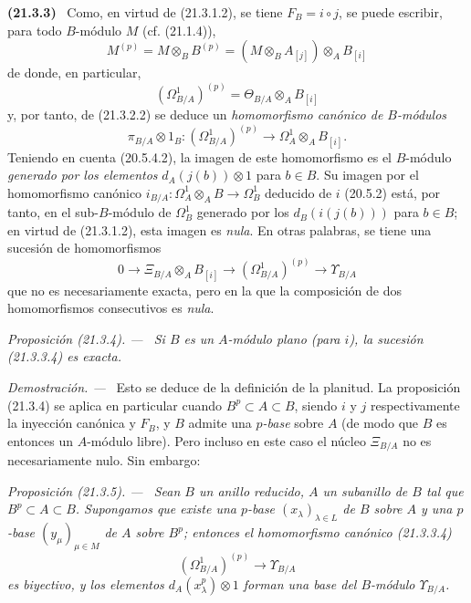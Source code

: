 \documentclass[10pt,oneside]{book}
\makeatletter
\newcommand{\setmanualcurrentlabel}[1]{\def\@currentlabel{#1}}
\newenvironment{env}[1][]{\setmanualcurrentlabel{#1}\par\medskip\noindent\textbf{(#1)}\ }{\par}
\newenvironment{proposition}[1][]{%
  \setmanualcurrentlabel{#1}\par\medskip\noindent\itshape Proposición (#1). ---\ }{\par}
\newenvironment{proof}{%
  \par\medskip\noindent\textit{Demostración. ---\ }}{\par}
\makeatother
\begin{document}
\begin{env}[21.3.3]
\label{0.21.3.3-es}
Como, en virtud de (21.3.1.2), se tiene $F_B=i\circ j$, se puede escribir,
para todo $B$-módulo $M$ (cf. (21.1.4)),
\begin{equation}
\tag{21.3.3.1}\label{0.21.3.3.1-es}
M^{(p)}=M\otimes_B B^{(p)}=(M\otimes_B A_{[j]})\otimes_A B_{[i]}
\end{equation}
de donde, en particular,
\begin{equation}
\tag{21.3.3.2}\label{0.21.3.3.2-es}
(\Omega^1_{B/A})^{(p)}=\Theta_{B/A}\otimes_A B_{[i]}
\end{equation}
y, por tanto, de (21.3.2.2) se deduce un \emph{homomorfismo canónico de
$B$-módulos}
\begin{equation}
\tag{21.3.3.3}\label{0.21.3.3.3-es}
\pi_{B/A}\otimes1_B:(\Omega^1_{B/A})^{(p)}\longrightarrow
\Omega^1_A\otimes_A B_{[i]}.
\end{equation}
Teniendo en cuenta (20.5.4.2), la imagen de este homomorfismo es el $B$-módulo
\emph{generado por los elementos} $d_A(j(b))\otimes1$ para $b\in B$. Su imagen por
el homomorfismo canónico $i_{B/A}:\Omega^1_A\otimes_A B\to\Omega^1_B$
deducido de $i$ (20.5.2) está, por tanto, en el sub-$B$-módulo de
$\Omega^1_B$ generado por los $d_B(i(j(b)))$ para $b\in B$; en virtud de
(21.3.1.2), esta imagen es \emph{nula}. En otras palabras, se tiene una sucesión de
homomorfismos
\begin{equation}
\tag{21.3.3.4}\label{0.21.3.3.4-es}
0\to\Xi_{B/A}\otimes_A B_{[i]}\to(\Omega^1_{B/A})^{(p)}
\to\Upsilon_{B/A}
\end{equation}
que no es necesariamente exacta, pero en la que la composición de dos
homomorfismos consecutivos es \emph{nula}.
\end{env}

\begin{proposition}[21.3.4]
\label{0.21.3.4-es}
Si $B$ es un $A$-módulo plano (para $i$), la sucesión (21.3.3.4) es exacta.
\end{proposition}
\begin{proof}
Esto se deduce de la definición de la planitud. La proposición (21.3.4) se aplica en
particular cuando $B^p\subset A\subset B$, siendo $i$ y $j$ respectivamente
la inyección canónica y $F_B$, y $B$ admite una \emph{$p$-base} sobre $A$ (de modo
que $B$ es entonces un $A$-módulo libre). Pero incluso en este caso el núcleo
$\Xi_{B/A}$ no es necesariamente nulo. Sin embargo:
\end{proof}

\begin{proposition}[21.3.5]
\label{0.21.3.5-es}
Sean $B$ un anillo reducido, $A$ un subanillo de $B$ tal que
$B^p\subset A\subset B$. Supongamos que existe una $p$-base
$(x_\lambda)_{\lambda\in L}$ de $B$ sobre $A$ y una $p$-base
$(y_\mu)_{\mu\in M}$ de $A$ sobre $B^p$; entonces el homomorfismo canónico
(21.3.3.4)
\begin{equation}
\tag{21.3.5.1}\label{0.21.3.5.1-es}
(\Omega^1_{B/A})^{(p)}\longrightarrow\Upsilon_{B/A}
\end{equation}
es biyectivo, y los elementos $d_A(x_\lambda^p)\otimes1$ forman una base del
$B$-módulo $\Upsilon_{B/A}$.
\end{proposition}
\end{document}
